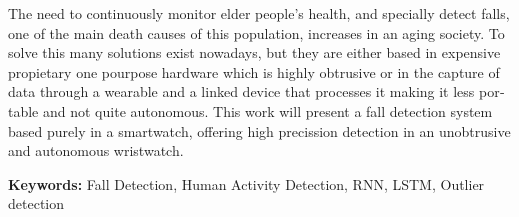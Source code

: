 \documentclass[../tfm.tex]{subfiles}
\begin{document}
\begin{otherlanguage}{english}
The need to continuously monitor elder people's health, and specially detect falls, one of the main death causes of this population, increases in an aging society. To solve this many solutions exist nowadays, but they are either based in expensive propietary one pourpose hardware which is highly obtrusive or in the capture of data through a wearable and a linked device that processes it making it less portable and not quite autonomous. This work will present a fall detection system based purely in a smartwatch, offering high precission detection in an unobtrusive and autonomous wristwatch.

{\bf Keywords:} Fall Detection, Human Activity Detection, RNN, LSTM, Outlier detection
\end{otherlanguage}
\end{document}
